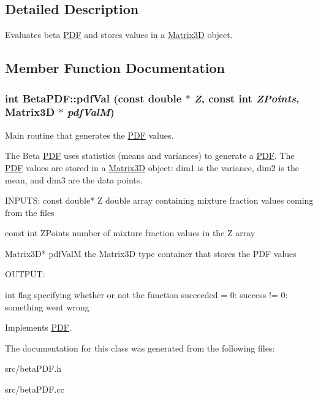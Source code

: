 \subsection{Detailed Description}
Evaluates beta \hyperlink{classPDF}{PDF} and stores values in a \hyperlink{classMatrix3D}{Matrix3D} object. 

\subsection{Member Function Documentation}
\hypertarget{classBetaPDF_a5c27da056f9c9b17af0888fac7df2c9f}{
\subsubsection[{pdfVal}]{\setlength{\rightskip}{0pt plus 5cm}int BetaPDF::pdfVal (const double $\ast$ {\em Z}, \/  const int {\em ZPoints}, \/  {\bf Matrix3D} $\ast$ {\em pdfValM})}}
\label{de/d4f/classBetaPDF_a5c27da056f9c9b17af0888fac7df2c9f}


Main routine that generates the \hyperlink{classPDF}{PDF} values. 

The Beta \hyperlink{classPDF}{PDF} uses statistics (means and variances) to generate a \hyperlink{classPDF}{PDF}. The \hyperlink{classPDF}{PDF} values are stored in a \hyperlink{classMatrix3D}{Matrix3D} object: dim1 is the variance, dim2 is the mean, and dim3 are the data points.

\begin{DoxyVerb}

  INPUTS: 
  const double* Z        double array containing mixture fraction values coming from the files

  const int ZPoints      number of mixture fraction values in the Z array

  Matrix3D* pdfValM      the Matrix3D type container that stores the PDF values

  
  OUTPUT:

  int                    flag specifying whether or not the function succeeded
                          = 0: success
			 != 0: something went wrong

  \end{DoxyVerb}
 

Implements \hyperlink{classPDF}{PDF}.



The documentation for this class was generated from the following files:\begin{DoxyCompactItemize}
\item 
src/betaPDF.h\item 
src/betaPDF.cc\end{DoxyCompactItemize}
